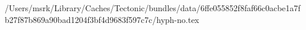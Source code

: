 /Users/msrk/Library/Caches/Tectonic/bundles/data/6ffe055852f8faf66c0acbe1a7fb27f87b869a90bad1204f3bf4d9683f597c7c/hyph-no.tex